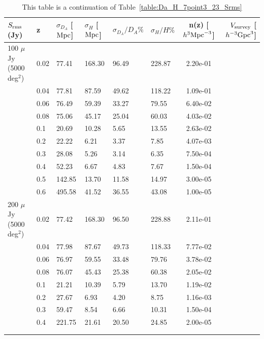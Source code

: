 \documentclass[useAMS,usenatbib]{mn2e}
\begin{document}
\begin{table}
\caption{This table is a continuation of Table~\ref{table:Da_H_7point3_23_Srms}}
\begin{tabular}{l|l|l|l|l|lc||r}
\hline
\hline 
\multirow{1}{*}{ $S_{\rm rms}$ (Jy) }& z & $\sigma_{D_A}$ [${\rm Mpc}$]&  $\sigma_{H}$ [${\rm Mpc}$]& $\sigma_{D_A}/{D_A} \%$ & $\sigma_{H}/H\%$ &n(z) [$h^{3} {\rm Mpc}^{-3}$]& $V_{\rm survey}$ [$h^{-3} {\rm Gpc}^3$]\\
\hline
\hline
\multirow{1}{*}{100 $\mu$Jy (5000 deg$^2$) }
& 0.02 &  77.41 & 168.30 & 96.49 & 228.87 & 2.20e-01 \\
& 0.04 &  77.81 & 87.59 & 49.62 & 118.22 & 1.09e-01 \\
& 0.06 &  76.49 & 59.39 & 33.27 & 79.55 & 6.40e-02 \\
& 0.08 &  75.06 & 45.17 & 25.04 & 60.03 & 4.03e-02 \\
& 0.1 &  20.69 & 10.28 & 5.65 & 13.55 & 2.63e-02 \\
& 0.2 &  22.22 & 6.21 & 3.37 & 7.85 & 4.07e-03 \\
& 0.3 &  28.08 & 5.26 & 3.14 & 6.35 & 7.50e-04 \\
& 0.4 &  52.23 & 6.67 & 4.83 & 7.67 & 1.50e-04 \\
& 0.5 &  142.85 & 13.70 & 11.58 & 14.97 & 3.00e-05 \\
& 0.6 &  495.58 & 41.52 & 36.55 & 43.08 & 1.00e-05 \\
\hline
\multirow{1}{*}{200 $\mu$Jy (5000 deg$^2$) }
& 0.02 &  77.42 & 168.30 & 96.50 & 228.88 & 2.11e-01 \\
& 0.04 &  77.98 & 87.67 & 49.73 & 118.33 & 7.77e-02 \\
& 0.06 &  76.97 & 59.55 & 33.48 & 79.76 & 3.78e-02 \\
& 0.08 &  76.07 & 45.43 & 25.38 & 60.38 & 2.05e-02 \\
& 0.1 &  21.21 & 10.39 & 5.79 & 13.70 & 1.19e-02 \\
& 0.2 &  27.67 & 6.93 & 4.20 & 8.75 & 1.16e-03 \\
& 0.3 &  59.47 & 8.54 & 6.66 & 10.31 & 1.50e-04 \\
& 0.4 &  221.75 & 21.61 & 20.50 & 24.85 & 2.00e-05 \\
\hline\\\\
\end{tabular}
\label{Da_H_200_100_Srms}
\end{table}



\label{lastpage}
\end{document}
